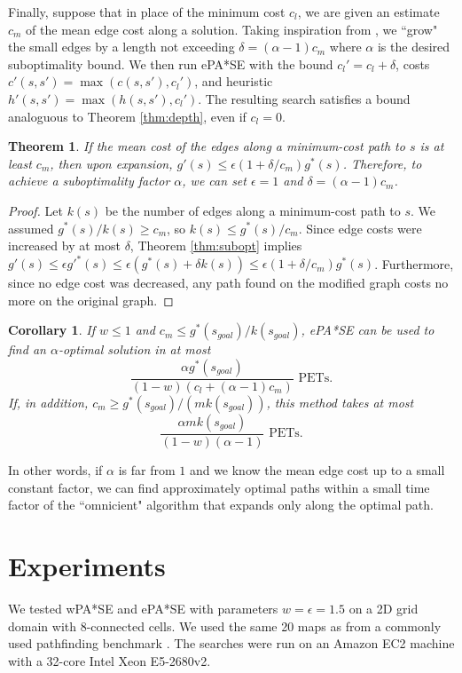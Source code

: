 \documentclass[letterpaper]{article}
\newtheorem{thm}{Theorem}
\newtheorem{cor}{Corollary}
\begin{document}
Finally, suppose that in place of the minimum cost $c_l$, we are given an estimate $c_m$ of the mean edge cost along a solution. Taking inspiration from \cite{klein1997randomized}, we ``grow" the small edges by a length not exceeding $\delta = (\alpha-1)c_m$ where $\alpha$ is the desired suboptimality bound. We then run ePA*SE with the bound $c_l' = c_l+\delta$, costs $c'(s,s') = \max(c(s,s'), c_l')$, and heuristic $h'(s,s') = \max(h(s,s'), c_l')$. The resulting search satisfies a bound analoguous to Theorem \ref{thm:depth}, even if $c_l=0$.

\begin{thm}
\label{thm:delta}
If the mean cost of the edges along a minimum-cost path to $s$ is at least $c_m$, then upon expansion, $g'(s) \le \epsilon(1+\delta/c_m)g^*(s)$. Therefore, to achieve a suboptimality factor $\alpha$, we can set $\epsilon=1$ and $\delta = (\alpha-1)c_m$.
\end{thm}

\begin{proof}
Let $k(s)$ be the number of edges along a minimum-cost path to $s$. We assumed $g^*(s) / k(s) \ge c_m$, so $k(s) \le g^*(s) / c_m$.
Since edge costs were increased by at most $\delta$, Theorem \ref{thm:subopt} implies $g'(s) \le \epsilon g'^*(s) \le \epsilon(g^*(s) + \delta k(s)) \le \epsilon(1+\delta/c_m)g^*(s)$. Furthermore, since no edge cost was decreased, any path found on the modified graph costs no more on the original graph.
\end{proof}

\begin{cor}
\label{cor:delta}
If $w \le 1$ and $c_m \le g^*(s_{goal}) / k(s_{goal})$, ePA*SE can be used to find an $\alpha$-optimal solution in at most
\[\frac{\alpha g^*(s_{goal})}{(1-w)(c_l+(\alpha-1)c_m)}\text{ PETs.}\]
If, in addition, $c_m \ge g^*(s_{goal})/(mk(s_{goal}))$, this method takes at most
\[\frac{\alpha mk(s_{goal})}{(1-w)(\alpha-1)}\text{ PETs.}\]
\end{cor}

In other words, if $\alpha$ is far from $1$ and we know the mean edge cost up to a small constant factor, we can find approximately optimal paths within a small time factor of the ``omnicient" algorithm that expands only along the optimal path.

\section{Experiments}

We tested wPA*SE and ePA*SE with parameters $w=\epsilon=1.5$ on a 2D grid domain with 8-connected cells. We used the same 20 maps as \cite{phillips2014pa} from a commonly used pathfinding benchmark \cite{sturtevant2012benchmarks}. The searches were run on an Amazon EC2 machine with a 32-core Intel Xeon E5-2680v2.
\end{document}
